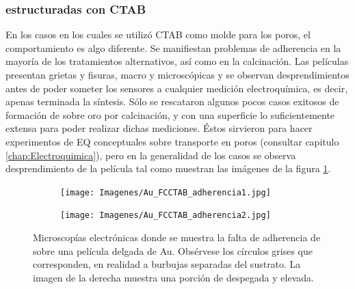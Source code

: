 			\subsubsection*{\pdm\space estructuradas con CTAB}	     		
				     		
			En los casos en los cuales se utilizó CTAB como molde para los poros, el comportamiento es algo diferente. Se manifiestan problemas de adherencia en la mayoría de los tratamientos alternativos, así como en la calcinación. Las películas presentan grietas y fisuras, macro y microscópicas y se observan desprendimientos antes de poder someter los sensores a cualquier medición electroquímica, es decir, apenas terminada la síntesis. Sólo se rescataron algunos pocos casos exitosos de formación de \pdmC\space sobre oro por calcinación, y con una superficie lo suficientemente extensa para poder realizar dichas mediciones. Éstos sirvieron para hacer experimentos de EQ conceptuales sobre transporte en poros (consultar capitulo \ref{chap:Electroquimica}), pero en la generalidad de los casos se observa desprendimiento de la película tal como muestran las imágenes de la figura \ref{fig:CTAB_adherencia}.

	     
				\begin{figure}[bh!]
		 	   	    \begin{subfigure}[t]{0.49\textwidth}
			        	\texttt{[image: Imagenes/Au\_FCCTAB\_adherencia1.jpg]}
			       		\end{subfigure}
					\begin{subfigure}[t]{0.49\textwidth}
			 	   	    \texttt{[image: Imagenes/Au\_FCCTAB\_adherencia2.jpg]}
			       		\end{subfigure}
					 \caption[Adherencia de CTAB sobre electrodos.]{Microscopías electrónicas donde se muestra la falta de adherencia de \pdmC\space sobre una película delgada de Au. Obsérvese los círculos grises que corresponden, en realidad a burbujas separadas del sustrato. La imagen de la derecha muestra una porción de \pdmC\space despegada y elevada.}
					 \label{fig:CTAB_adherencia}	
				     \end{figure}
			
